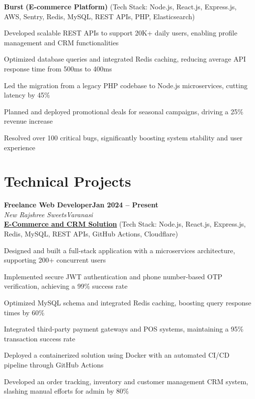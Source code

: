 \documentclass[letterpaper, 10pt]{article}
\newcommand{\heading}[2]{ \hspace{6pt}#1\hfill#2\\[0.8pt] }
\newcommand{\headingBf}[2]{ \heading{\textbf{#1}}{\textbf{#2}} }
\newcommand{\headingIt}[2]{ \heading{\textit{#1}}{\textit{#2}} }
\newenvironment{resume_list}{
\vspace{-5pt}
\begin{itemize}[itemsep=-3pt, parsep=0.2pt, leftmargin=20pt] }{ \end{itemize}
\vspace{-4pt}
}
\begin{document}
	\hspace{10pt}\textbf{Burst} \textbf{(E-commerce Platform)} \small{(Tech Stack: Node.js, React.js, Express.js, AWS, Sentry, Redis, MySQL, REST APIs, PHP, Elasticsearch)}
	\vspace{1pt}
	\begin{resume_list}
		\item Developed scalable REST APIs to support 20K+ daily users, enabling profile
		management and CRM functionalities \item Optimized database queries and integrated
		Redis caching, reducing average API response time from 500ms to 400ms \item
		Led the migration from a legacy PHP codebase to Node.js microservices, cutting
		latency by 45\% \item Planned and deployed promotional deals for seasonal
		campaigns, driving a 25\% revenue increase \item Resolved over 100 critical
		bugs, significantly boosting system stability and user experience
	\end{resume_list}

	\section{Technical Projects}
	\headingBf{Freelance Web Developer}{Jan 2024 -- Present}
	\vspace{1pt}
	\headingIt{New Rajshree Sweets}{Varanasi}
	\vspace{2pt}
	\hspace{10pt}\textbf{\href{https://newrajshreesweets.com}{\underline{E-Commerce and CRM Solution}}}
	\small{(Tech Stack: Node.js, React.js, Express.js, Redis, MySQL, REST APIs, GitHub Actions, Cloudflare)}
	\vspace{1pt}
	\begin{resume_list}
		\item Designed and built a full-stack application with a microservices architecture,
		supporting 200+ concurrent users \item Implemented secure JWT authentication
		and phone number-based OTP verification, achieving a 99\% success rate \item
		Optimized MySQL schema and integrated Redis caching, boosting query response
		times by 60\% \item Integrated third-party payment gateways and POS systems,
		maintaining a 95\% transaction success rate \item Deployed a containerized solution
		using Docker with an automated CI/CD pipeline through GitHub Actions \item Developed
		an order tracking, inventory and customer management CRM system, slashing manual
		efforts for admin by 80\%
	\end{resume_list}
\end{document}
